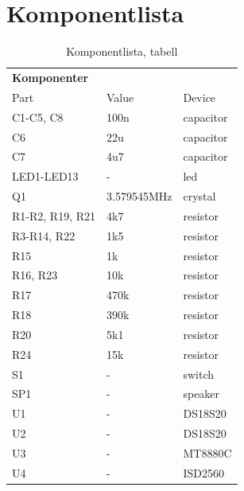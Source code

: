 \documentclass[a4paper,11pt]{article}
\begin{document}
	\section{Komponentlista}
	\label{sec:komponentlistasec}
	\begin{table} [H]
	\caption{Komponentlista, tabell} 
	\label{tab:komponentlista}
	\begin{tabular}{l l l}
		
		{\bf Komponenter}
		\\{Part} & {Value} & {Device}\\
		\hline
C1-C5, C8 & 100n & capacitor \\
C6 & 22u & capacitor \\
C7 & 4u7 & capacitor \\
LED1-LED13 & - & led \\
Q1 & 3.579545MHz & crystal \\
R1-R2, R19, R21 & 4k7 & resistor \\
R3-R14, R22 & 1k5 & resistor \\
R15 & 1k & resistor \\
R16, R23 & 10k & resistor \\
R17 & 470k & resistor \\
R18 & 390k & resistor \\
R20 & 5k1 & resistor \\
R24 & 15k & resistor \\
S1 & - & switch \\
SP1 & - & speaker \\
U1 & - & DS18S20 \\
U2 & - & DS18S20 \\
U3 & - & MT8880C \\
U4 & - & ISD2560 \\

	\end{tabular}
	\end{table}
\end{document}
